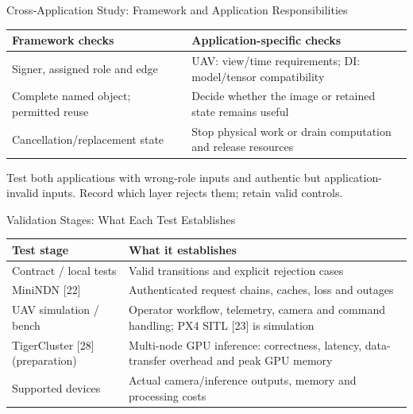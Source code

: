 \begin{frame}{Cross-Application Study: Framework and Application Responsibilities}
\small
\begin{tabularx}{\linewidth}{p{.34\linewidth}X}
\toprule Framework checks & Application-specific checks\\\midrule
Signer, assigned role and edge & UAV: view/time requirements; DI: model/tensor compatibility\\\midrule
Complete named object; permitted reuse & Decide whether the image or retained state remains useful\\\midrule
Cancellation/replacement state & Stop physical work or drain computation and release resources\\\bottomrule
\end{tabularx}
\vspace{1mm}\small Test both applications with wrong-role inputs and authentic but application-invalid inputs. Record which layer rejects them; retain valid controls.
\vspace{1mm}
\end{frame}

\begin{frame}{Validation Stages: What Each Test Establishes}
\small
\begin{tabularx}{\linewidth}{p{.31\linewidth}X}
\toprule Test stage & What it establishes\\\midrule
Contract / local tests & Valid transitions and explicit rejection cases\\\midrule
MiniNDN [22] & Authenticated request chains, caches, loss and outages\\\midrule
UAV simulation / bench & Operator workflow, telemetry, camera and command handling; PX4 SITL [23] is simulation\\\midrule
\raggedright TigerCluster [28]\newline (preparation) & Multi-node GPU inference: correctness, latency, data-transfer overhead and peak GPU memory\\\midrule
Supported devices & Actual camera/inference outputs, memory and processing costs\\\bottomrule
\end{tabularx}
\vspace{3mm}
\end{frame}

